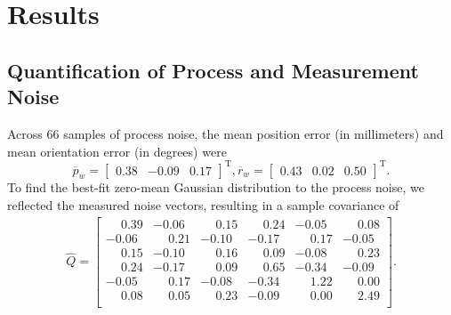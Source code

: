 \section{Results}
\subsection{Quantification of Process and Measurement Noise}
Across 66 samples of process noise, the mean position error (in millimeters) and mean orientation error (in degrees) were \[{\overline{p}_{w}} = \begin{bmatrix} 0.38 &-0.09 &0.17 \end{bmatrix}^{\text{T}}, {\overline{r}_{w}} = \begin{bmatrix} 0.43 &0.02 &0.50 \end{bmatrix}^{\text{T}}.\] To find the best-fit zero-mean Gaussian distribution to the process noise, we reflected the measured noise vectors, resulting in a sample covariance of
\begin{align*}
{\hat{Q}} = \begin{bmatrix} 
\phantom{-}0.39 	& -0.06 	& \phantom{-}0.15 		& \phantom{-}0.24 		& -0.05 	& \phantom{-}0.08\\ 
-0.06 			& \phantom{-}0.21  	& -0.10   	& -0.17 	& \phantom{-}0.17 		& -0.05\\
\phantom{-}0.15 	& -0.10 	& \phantom{-}0.16    	& \phantom{-}0.09 		& -0.08 	& \phantom{-}0.23\\
\phantom{-}0.24 	& -0.17 	& \phantom{-}0.09  	& \phantom{-}0.65 		& -0.34 	& -0.09\\
-0.05 	& \phantom{-}0.17		& -0.08 	& -0.34 	& \phantom{-}1.22		& \phantom{-}0.00\\
\phantom{-}0.08 	& \phantom{-}0.05		& \phantom{-}0.23  	& -0.09 	& \phantom{-}0.00 	& \phantom{-}2.49\\
\end{bmatrix}.
\end{align*}

